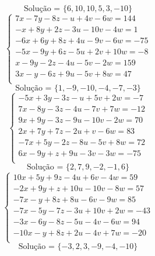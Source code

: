 \documentclass[12pt,oneside,a4paper]{article}
\begin{document}
\begin{equation*}
\text{Solução = }\{6,10,10,5,3,-10\}
\end{equation*}
\vspace{\baselineskip}
\begin{equation*}
\begin{cases}
7x-7y-8z-u+4v-6w=144 \\
-x+8y+2z-3u-10v-4w=1 \\
-6x+6y+8z+4u-9v-6w=-75 \\
-5x-9y+6z-5u+2v+10w=-8 \\
x-9y-2z-4u-5v-2w=159 \\
3x-y-6z+9u-5v+8w=47 \\
\end{cases}
\end{equation*}
\begin{equation*}
\text{Solução = }\{1,-9,-10,-4,-7,-3\}
\end{equation*}
\vspace{\baselineskip}
\begin{equation*}
\begin{cases}
-5x+3y-3z-u+5v+2w=-7 \\
7x-8y-3z-4u-7v+7w=-12 \\
9x+9y-3z-9u-10v-2w=70 \\
2x+7y+7z-2u+v-6w=83 \\
-7x+5y-2z-8u-5v+8w=72 \\
6x-9y+z+9u-3v-3w=-75 \\
\end{cases}
\end{equation*}
\begin{equation*}
\text{Solução = }\{2,7,9,-2,-1,6\}
\end{equation*}
\vspace{\baselineskip}
\begin{equation*}
\begin{cases}
10x+5y+9z-4u+6v-4w=59 \\
-2x+9y+z+10u-10v-8w=57 \\
-7x-y+8z+8u-6v-9w=85 \\
-7x-5y-7z-3u+10v+2w=-43 \\
-3x-6y-8z-5u-4v-6w=94 \\
-10x-y+8z+2u-4v+7w=-20 \\
\end{cases}
\end{equation*}
\begin{equation*}
\text{Solução = }\{-3,2,3,-9,-4,-10\}
\end{equation*}
\end{document}
